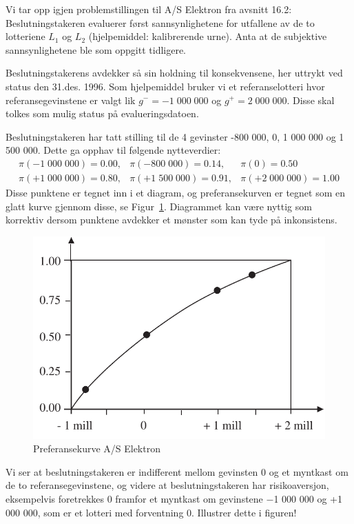 {{Vi tar opp igjen problemstillingen til A/S Elektron fra avsnitt 16.2: 
Beslutningstakeren eva\-luerer først sannsynlighetene
for utfallene av de to lotteriene $L_1$ og $L_2$ 
(hjelpemiddel: kalibrerende urne).  Anta at de subjektive sannsynlighetene
ble som oppgitt tidligere.

Beslutningstakerens avdekker så sin holdning til konsekvensene, 
her uttrykt ved status den 31.des. 1996.  Som hjelpemiddel
bruker vi et refe\-ranse\-lotteri hvor referansegevinstene er valgt lik 
$g^- = -1\;000\;000$ og $g^+ = 2\;000\;000$.  Disse skal tolkes som mulig
status på evalueringsdatoen.  

Beslutningstakeren har tatt stilling til de 4 gevinster -800 000, 0, 
1 000 000 og 1 500 000. Dette ga opphav til følgende nytteverdier:
\begin{eqnarray*}
 \pi (-1\;000\;000) = 0.00,& \pi (-800\;000) = 0.14, & \pi (0)     = 0.50 \\
 \pi (+1\;000\;000) = 0.80,& \pi (+1\;500\;000) = 0.91,& \pi (+2\;000\;000) = 1.00  
\end{eqnarray*}
Disse punktene er tegnet inn i et diagram, og preferansekurven
er tegnet som en glatt kurve gjennom disse, se Figur~\ref{fig:pref_elektron}.
Diagrammet kan være nyttig som korrektiv dersom punktene 
avdekker et mønster som kan tyde på inkonsistens.


\begin{figure}[ht]
\centering
	\includegraphics[scale=1.0]{figurer/fig16_19.pdf} 
\caption{Preferansekurve A/S Elektron}
	\label{fig:pref_elektron}
\end{figure}

Vi ser  at beslutningstakeren er indifferent mellom gevinsten 0 og et myntkast
om de to referansegevinstene, og videre at beslutningstakeren
har risikoaversjon, eksempelvis foretrekkes $0$ framfor et myntkast om
gevinstene $-$1 000 000 og +1 000 000, som er et lotteri med forventning {0}.
Illustrer dette i figuren!

}}
